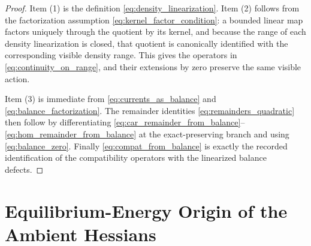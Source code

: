 \documentclass[11pt]{article}
\begin{document}
\begin{proof}
Item (1) is the definition \eqref{eq:density_linearization}. Item (2) follows from the factorization assumption \eqref{eq:kernel_factor_condition}: a bounded linear map factors uniquely through the quotient by its kernel, and because the range of each density linearization is closed, that quotient is canonically identified with the corresponding visible density range. This gives the operators in \eqref{eq:continuity_on_range}, and their extensions by zero preserve the same visible action.

Item (3) is immediate from \eqref{eq:currents_as_balance} and \eqref{eq:balance_factorization}. The remainder identities \eqref{eq:remainders_quadratic} then follow by differentiating \eqref{eq:car_remainder_from_balance}--\eqref{eq:hom_remainder_from_balance} at the exact-preserving branch and using \eqref{eq:balance_zero}. Finally \eqref{eq:compat_from_balance} is exactly the recorded identification of the compatibility operators with the linearized balance defects.
\end{proof}

\section{Equilibrium-Energy Origin of the Ambient Hessians}
\end{document}
